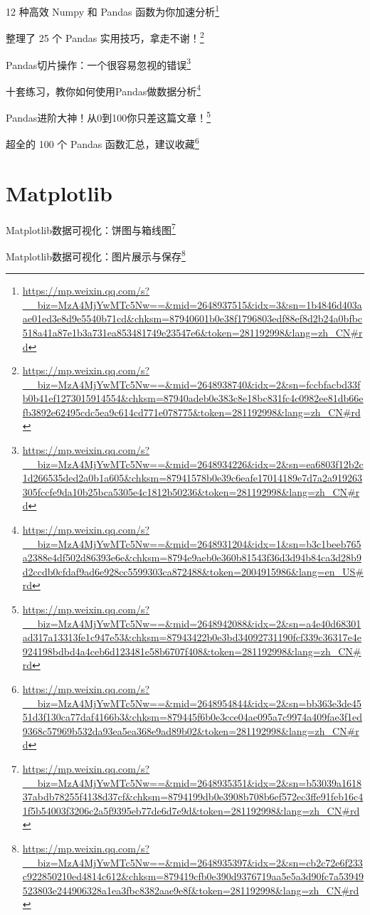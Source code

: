 \documentclass[]{ctexbook}
\renewcommand{\href}[2]{#2\footnote{\url{#1}}}
\begin{document}
\href{https://mp.weixin.qq.com/s?__biz=MzA4MjYwMTc5Nw==\&mid=2648937515\&idx=3\&sn=1b4846d403aae01ed3e8d9e5540b71cd\&chksm=87940601b0e38f1796803edf88ef8d2b24a0bfbc518a41a87e1b3a731ea853481749e23547e6\&token=281192998\&lang=zh_CN\#rd}{12 种高效 Numpy 和 Pandas 函数为你加速分析}

\href{https://mp.weixin.qq.com/s?__biz=MzA4MjYwMTc5Nw==\&mid=2648938740\&idx=2\&sn=fccbfacbd33fb0b41ef1273015914554\&chksm=87940adeb0e383c8e18bc831fc4c0982ee81db66efb3892e62495cdc5ea9c614cd771e078775\&token=281192998\&lang=zh_CN\#rd}{整理了 25 个 Pandas 实用技巧，拿走不谢！}

\href{https://mp.weixin.qq.com/s?__biz=MzA4MjYwMTc5Nw==\&mid=2648934226\&idx=2\&sn=ea6803f12b2c1d266535ded2a0b1a605\&chksm=87941578b0e39c6eafe17014189e7d7a2a919263305fccfe9da10b25bca5305e4c1812b50236\&token=281192998\&lang=zh_CN\#rd}{Pandas切片操作：一个很容易忽视的错误}

\href{https://mp.weixin.qq.com/s?__biz=MzA4MjYwMTc5Nw==\&mid=2648931204\&idx=1\&sn=b3c1beeb765a2388e4df502d86393e6e\&chksm=8794e9aeb0e360b81543f36d3d94b84ca3d28b9d2ccdb0cfdaf9ad6e928cc5599303ca872488\&token=2004915986\&lang=en_US\#rd}{十套练习，教你如何使用Pandas做数据分析}

\href{https://mp.weixin.qq.com/s?__biz=MzA4MjYwMTc5Nw==\&mid=2648942088\&idx=2\&sn=a4e40d68301ad317a13313fe1c947e53\&chksm=87943422b0e3bd34092731190fcf339c36317e4e924198bdbd4a4ceb6d123481e58b6707f408\&token=281192998\&lang=zh_CN\#rd}{Pandas进阶大神！从0到100你只差这篇文章！}

\href{https://mp.weixin.qq.com/s?__biz=MzA4MjYwMTc5Nw==\&mid=2648954844\&idx=2\&sn=bb363e3de4551d3f130ca77daf4166b3\&chksm=879445f6b0e3cce04ae095a7c9974a409fae3f1ed9368c57969b532da93ea5ea368e9ad89b02\&token=281192998\&lang=zh_CN\#rd}{超全的 100 个 Pandas 函数汇总，建议收藏}

\hypertarget{matplotlib}{%
\section{Matplotlib}\label{matplotlib}}

\href{https://mp.weixin.qq.com/s?__biz=MzA4MjYwMTc5Nw==\&mid=2648935351\&idx=2\&sn=b53039a161837abdb78255f4138d37cf\&chksm=8794199db0e3908b708b6ef572ec3ffe91feb16c41f5b54003f3206c2a5f9395eb77de6d7e9d\&token=281192998\&lang=zh_CN\#rd}{Matplotlib数据可视化：饼图与箱线图}

\href{https://mp.weixin.qq.com/s?__biz=MzA4MjYwMTc5Nw==\&mid=2648935397\&idx=2\&sn=cb2c72e6f233c922850210ed4814c612\&chksm=879419cfb0e390d9376719aa5e5a3d90fc7a53949523803e244906328a1ea3fbc8382aae9e8f\&token=281192998\&lang=zh_CN\#rd}{Matplotlib数据可视化：图片展示与保存}
\end{document}
